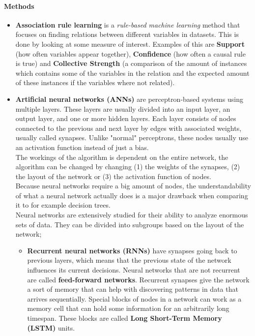 \paragraph{Methods}
\begin{itemize}
	\item \textbf{Association rule learning}
		is a \textit{rule-based machine learning} method that focuses on finding relations between different variables in datasets. This is done by looking at some measure of interest. Examples of this are \textbf{Support} (how often variables appear together), \textbf{Confidence} (how often a causal rule is true) and \textbf{Collective Strength} (a comparison of the amount of instances which contains some of the variables in the relation and the expected amount of these instances if the variables where not related).
	\item \textbf{Artificial neural networks (ANNs)}
		are perceptron-based systems using multiple layers. These layers are usually divided into an input layer, an output layer, and one or more hidden layers. Each layer consists of nodes connected to the previous and next layer by edges with associated weights, usually called synapses. Unlike "normal" perceptrons, these nodes usually use an activation function instead of just a bias.\\
		The workings of the algorithm is dependent on the entire network, the algorithm can be changed by changing (1) the weights of the synapses, (2) the layout of the network or (3) the activation function of nodes.\\
		Because neural networks require a big amount of nodes, the understandability of what a neural network actually does is a major drawback when comparing it to for example decision trees.\\
		Neural networks are extensively studied for their ability to analyze enormous sets of data. They can be divided into subgroups based on the layout of the network;
		\begin{itemize}
			\item \textbf{Recurrent neural networks (RNNs)}
				have synapses going back to previous layers, which means that the previous state of the network influences its current decisions. Neural networks that are not recurrent are called \textbf{feed-forward networks}. Recurrent synapses give the network a sort of memory that can help with discovering patterns in data that arrives sequentially. Special blocks of nodes in a network can work as a memory cell that can hold some information for an arbitrarily long timespan. These blocks are called \textbf{Long Short-Term Memory (LSTM)} units.

\end{itemize}
\end{itemize}
